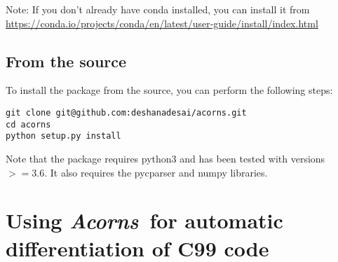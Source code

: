 \documentclass[a4,oneside]{book}
\def\Acorns{\emph{Acorns}}
\begin{document}
Note: If you don't already have conda installed, you can install it from \url{https://conda.io/projects/conda/en/latest/user-guide/install/index.html}

\subsection{From the source}
To install the package from the source, you can perform the following steps: \newline
\begin{lstlisting}
git clone git@github.com:deshanadesai/acorns.git 
cd acorns
python setup.py install
\end{lstlisting}


Note that the package requires python3 and has been tested with versions $>=3.6$.
It also requires the pycparser and numpy libraries. 

\section{Using \Acorns\ for automatic differentiation of C99 code}
\label{sec:ad}
\end{document}
